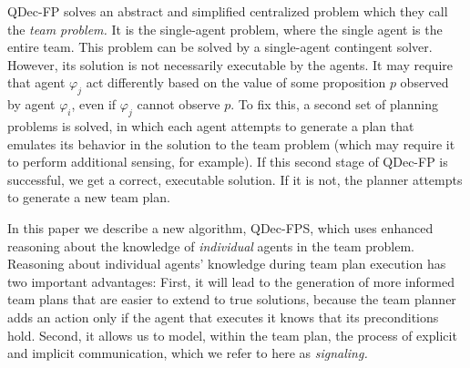 \documentclass[letterpaper]{article} %
\theoremstyle{definition}
\begin{document}
QDec-FP solves an abstract and simplified centralized problem which they call the {\em team problem.}
%
It is the single-agent problem, where the single agent is the entire team. This problem can be solved by a single-agent contingent solver.
However, its solution
is not necessarily executable by the agents. It may require that agent $\varphi_j$ act differently based on the value of some proposition $p$ observed by agent $\varphi_i$, even if $\varphi_j$ cannot observe $p$.
To fix this, a second set of planning problems is solved, in which each agent attempts to generate a plan that emulates its behavior in the solution to the team problem (which may require it to perform additional sensing, for example).
If this  second stage of QDec-FP is successful, we get a correct, executable solution. If it is not, the planner attempts to generate a new team plan.

In this paper we describe a new algorithm, QDec-FPS, which uses enhanced reasoning about the  knowledge of {\em individual} agents in the team problem.
Reasoning about individual agents' knowledge
during team plan execution has two important advantages: First, it will lead to the generation of more informed team plans that are easier to extend to true solutions, because the team planner adds an action only if the agent that executes it knows that its preconditions hold.
Second, it allows us to model, within the team plan, the process of explicit and implicit communication, which we refer to here as {\em signaling.}

\end{document}
